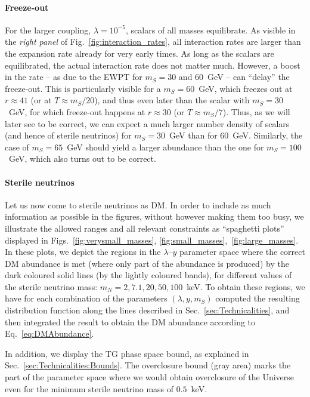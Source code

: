 \paragraph{Freeze-out} For the larger coupling, $\lambda=10^{-5}$, scalars of all masses equilibrate. As visible in the \emph{right panel} of Fig.~\ref{fig:interaction_rates}, all interaction rates are larger than the expansion rate already for very early times. As long as the scalars are equilibrated, the actual interaction rate does not matter much. However, a boost in the rate -- as due to the EWPT for $m_S = 30$ and $60$~GeV -- can ``delay'' the freeze-out. This is particularly visible for a $m_S = 60$~GeV, which freezes out at $r \approx 41$ (or at $T\approx m_S/20$), and thus even later than the scalar with $m_S = 30$~GeV, for which freeze-out happens at $r\approx 30$ (or $T\approx m_S/7$). Thus, as we will later see to be correct, we can expect a much larger number density of scalars (and hence of sterile neutrinos) for $m_S = 30$~GeV than for $60$~GeV. Similarly, the case of $m_S = 65$~GeV should yield a larger abundance than the one for $m_S = 100$~GeV, which also turns out to be correct.

\paragraph{Sterile neutrinos} Let us now come to sterile neutrinos as DM. In order to include as much information as possible in the figures, without however making them too busy, we illustrate the allowed ranges and all relevant constraints as ``spaghetti plots'' displayed in Figs.~\ref{fig:verysmall_masses}, \ref{fig:small_masses},~\ref{fig:large_masses}. In these plots, we depict the regions in the $\lambda$--$y$ parameter space where the correct DM abundance is met (where only part of the abundance is produced) by the dark coloured solid lines (by the lightly coloured bands), for different values of the sterile neutrino mass: $m_N = 2, 7.1, 20, 50, 100$~keV. To obtain these regions, we have for each combination of the parameters $(\lambda, y, m_S)$ computed the resulting distribution function along the lines described in Sec.~\ref{sec:Technicalities}, and then integrated the result to obtain the DM abundance according to Eq.~\eqref{eq:DMAbundance}.

In addition, we display the TG phase space bound, as explained in Sec.~\ref{sec:Technicalities:Bounds}. The overclosure bound (gray area) marks the part of the parameter space where we would obtain overclosure of the Universe even for the minimum sterile neutrino mass of $0.5$~keV.

